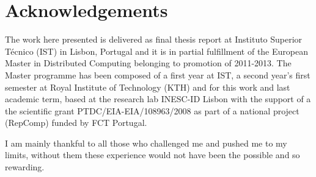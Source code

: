 \newpage


\chapter*{Acknowledgements}
\thispagestyle{empty}


The work here presented is delivered as final thesis report at Instituto Superior Técnico (IST) in Lisbon, Portugal and it is in partial fulfillment of the European Master in Distributed Computing belonging to promotion of 2011-2013. The Master programme has been composed of a first year at IST, a second year's first semester at Royal Institute of Technology (KTH) and for this work and last academic term, based at the research lab INESC-ID Lisbon with the support of a the scientific grant PTDC/EIA-EIA/108963/2008 as part of a national project (RepComp) funded by FCT Portugal.

I am mainly thankful to all those who challenged me and pushed me to my limits, without them these experience would not have been the possible and so rewarding.

